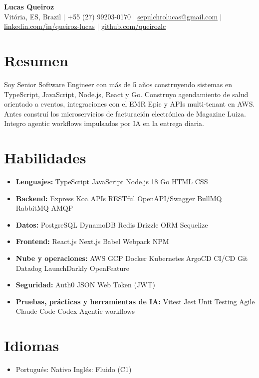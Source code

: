 \documentclass[letterpaper,10pt]{article}
\newcommand{\resumeItem}[1]{\item\small{#1}}
\newcommand{\resumeSubHeadingList}{\begin{itemize}[leftmargin=0.15in, label={}, nosep, beginpenalty=10000]}
\newcommand{\resumeSubHeadingListEnd}{\end{itemize}}
\begin{document}
\begin{center}
  \textbf{\Huge Lucas Queiroz} \\[3pt]
  \small Vit\'oria, ES, Brazil $|$ +55 (27) 99203-0170 $|$ \href{mailto:sepulchrolucas@gmail.com}{sepulchrolucas@gmail.com} $|$
  \href{https://linkedin.com/in/queiroz-lucas}{linkedin.com/in/queiroz-lucas} $|$
  \href{https://github.com/queirozlc}{github.com/queirozlc}
\end{center}
\vspace{2pt}

\section{Resumen}
Soy Senior Software Engineer con m\'as de 5 a\~nos construyendo sistemas en TypeScript, JavaScript, Node.js, React y Go. Construyo agendamiento de salud orientado a eventos, integraciones con el EMR Epic y APIs multi-tenant en AWS. Antes constru\'i los microservicios de facturaci\'on electr\'onica de Magazine Luiza. Integro agentic workflows impulsados por IA en la entrega diaria.

\section{Habilidades}
\resumeSubHeadingList
\resumeItem{\textbf{Lenguajes:} TypeScript \textbar{} JavaScript \textbar{} Node.js 18 \textbar{} Go \textbar{} HTML \textbar{} CSS}
\resumeItem{\textbf{Backend:} Express \textbar{} Koa \textbar{} APIs RESTful \textbar{} OpenAPI/Swagger \textbar{} BullMQ \textbar{} RabbitMQ \textbar{} AMQP}
\resumeItem{\textbf{Datos:} PostgreSQL \textbar{} DynamoDB \textbar{} Redis \textbar{} Drizzle ORM \textbar{} Sequelize}
\resumeItem{\textbf{Frontend:} React.js \textbar{} Next.js \textbar{} Babel \textbar{} Webpack \textbar{} NPM}
\resumeItem{\textbf{Nube y operaciones:} AWS \textbar{} GCP \textbar{} Docker \textbar{} Kubernetes \textbar{} ArgoCD \textbar{} CI/CD \textbar{} Git \textbar{} Datadog \textbar{} LaunchDarkly \textbar{} OpenFeature}
\resumeItem{\textbf{Seguridad:} Auth0 \textbar{} JSON Web Token (JWT)}
\resumeItem{\textbf{Pruebas, pr\'acticas y herramientas de IA:} Vitest \textbar{} Jest \textbar{} Unit Testing \textbar{} Agile \textbar{} Claude Code \textbar{} Codex \textbar{} Agentic workflows}\resumeSubHeadingListEnd

\section{Idiomas}
\resumeSubHeadingList
\resumeItem{Portugu\'es: Nativo \textbar{} Ingl\'es: Fluido (C1)}
\resumeSubHeadingListEnd
\end{document}
